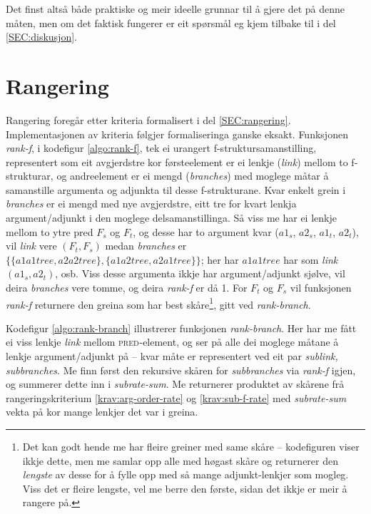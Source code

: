 \documentclass[11pt,a4paper,oneside,draft]{book}
\newcommand{\F}[2]{\textsc{#1}\ensuremath{_{#2}}}
\newcommand{\PRED}{\F{pred}{}}
\begin{document}
Det finst altså både praktiske og meir ideelle grunnar til å gjere det
på denne måten, men om det faktisk fungerer er eit spørsmål eg kjem
tilbake til i del \ref{SEC:diskusjon}.

\section{Rangering}
\label{sec-4.2}

\label{SEC:impl-f-rangering}

 Rangering foregår etter kriteria formalisert i del
 \ref{SEC:rangering}. Implementasjonen av kriteria følgjer
 formaliseringa ganske eksakt. Funksjonen \emph{rank-f}, i kodefigur
 \ref{algo:rank-f}, tek ei urangert f-struktursamanstilling,
 representert som eit avgjerdstre kor førsteelement er ei lenkje
 (\emph{link}) mellom to f-strukturar, og andreelement er ei mengd
 (\emph{branches}) med moglege måtar å samanstille argumenta og adjunkta
 til desse f-strukturane. Kvar enkelt grein i \emph{branches} er ei mengd
 med nye avgjerdstre, eitt tre for kvart lenkja argument/adjunkt i den
 moglege delsamanstillinga. Så viss me har ei lenkje mellom to ytre
 pred $F_s$ og $F_t$, og desse har to argument kvar ($a1_s$, $a2_s$,
 $a1_t$, $a2_t$), vil \emph{link} vere $(F_t,F_s)$ medan \emph{branches} er $\{
 \{ a1a1tree, a2a2tree \}, \{ a1a2tree, a2a1tree \} \}$; her har
 $a1a1tree$ har som \emph{link} $(a1_s, a2_t)$, osb. Viss desse argumenta
 ikkje har argument/adjunkt sjølve, vil deira \emph{branches} vere tomme,
 og deira \emph{rank-f} er då 1. For $F_t$ og $F_s$ vil funksjonen \emph{rank-f}
 returnere den greina som har best skåre\footnote{Det kan godt hende me har fleire greiner med same skåre --
        kodefiguren viser ikkje dette, men me samlar opp alle med
        høgast skåre og returnerer den \emph{lengste} av desse for å fylle
        opp med så mange adjunkt-lenkjer som mogleg. Viss det er
        fleire lengste, vel me berre den første, sidan det ikkje er
        meir å rangere på. }, gitt ved
 \emph{rank-branch}.

 Kodefigur \ref{algo:rank-branch} illustrerer funksjonen
 \emph{rank-branch}. Her har me fått ei viss lenkje \emph{link} mellom
 \PRED{}-element, og ser på alle dei moglege måtane å lenkje
 argument/adjunkt på -- kvar måte er representert ved eit par
 \emph{sublink, subbranches}. Me finn først den rekursive skåren for
 \emph{subbranches} via \emph{rank-f} igjen, og summerer dette inn i
 \emph{subrate-sum}. Me returnerer produktet av skårene frå
 rangeringskriterium \ref{krav:arg-order-rate} og
 \ref{krav:sub-f-rate} med \emph{subrate-sum} vekta på kor mange lenkjer
 det var i greina.
\end{document}
